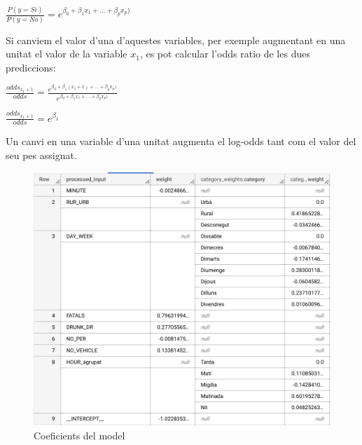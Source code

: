 \documentclass[12pt,longbibliography]{article}
\theoremstyle{definition}
\theoremstyle{remark}
\begin{document}
\begin{center}

$\frac{P(y = Si)}{P(y = No)}  = e^{ \beta_0 + \beta_1 x_1 + ... + \beta_p x_p)}$

\end{center}



Si canviem el valor d'una d'aquestes variables, per exemple augmentant en una unitat el valor de la variable $x_1$, es pot calcular l'odds ratio de les dues prediccions:

\begin{center}

$\frac{odds_{x_1 + 1}}{odds} = \frac{e^{ \beta_0 + \beta_1 (x_1 + 1) + ... + \beta_p x_p)}}{e^{ \beta_0 + \beta_1 x_1 + ... + \beta_p x_p)}}$

\vspace{2mm}

$\frac{odds_{x_1 + 1}}{odds} = e^{\beta_1}$

\end{center}


Un canvi en una variable d'una unitat augmenta el log-odds tant com el valor del seu pes assignat.

\begin{figure}[H]
\begin{center}
\includegraphics[width=15cm]{log3a}
\end{center}
\caption{Coeficients del model}
\label{fig:log3}
\end{figure}
\end{document}
